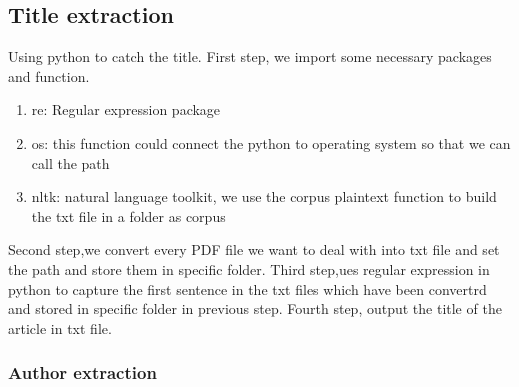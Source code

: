 	
\subsection*{Title extraction}
\item Using python to catch the title.
First step, we import some necessary packages and function.
\begin{enumerate}
	\item re: Regular expression package
	\item os: this function could connect the python to operating system so that we can call the path
	\item nltk: natural language toolkit, we use the corpus plaintext function to build the txt file in a folder as corpus
\end{enumerate}  
Second step,we convert every PDF file we want to deal with into txt file and set the path and store them in specific folder.
Third step,ues regular expression in python to capture the first sentence in the txt files which have been convertrd and stored in specific folder in previous step. 
Fourth step, output the title of the article in txt file.   

\subsubsection*{Author extraction}


